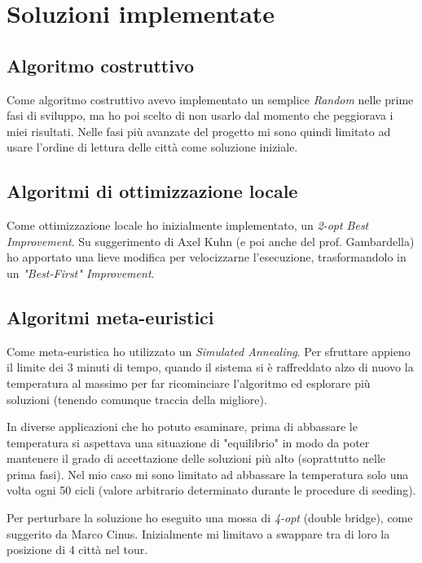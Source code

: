 \chapter*{Soluzioni implementate}
\label{cha_soluzioni}

\section*{Algoritmo costruttivo}
\label{sec_costruttivo}
Come algoritmo costruttivo avevo implementato un semplice \emph{Random} nelle prime fasi di sviluppo, ma ho poi scelto di non usarlo dal momento che peggiorava i miei risultati. Nelle fasi più avanzate del progetto mi sono quindi limitato ad usare l'ordine di lettura delle città come soluzione iniziale.

\section*{Algoritmi di ottimizzazione locale}
\label{sec_ottimizzazione}
Come ottimizzazione locale ho inizialmente implementato, un \emph{2-opt Best Improvement}. Su suggerimento di Axel Kuhn (e poi anche del prof. Gambardella) ho apportato una lieve modifica per velocizzarne l'esecuzione, trasformandolo in un \emph{"Best-First" Improvement}.

\section*{Algoritmi meta-euristici}
\label{sec_metaeuristici}
Come meta-euristica ho utilizzato un \emph{Simulated Annealing}. Per sfruttare appieno il limite dei 3 minuti di tempo, quando il sistema si è raffreddato alzo di nuovo la temperatura al massimo per far ricominciare l'algoritmo ed esplorare più soluzioni (tenendo comunque traccia della migliore). 

In diverse applicazioni che ho potuto esaminare, prima di abbassare le temperatura si aspettava una situazione di "equilibrio" in modo da poter mantenere il grado di accettazione delle soluzioni più alto (soprattutto nelle prima fasi). Nel mio caso mi sono limitato ad abbassare la temperatura solo una volta ogni 50 cicli (valore arbitrario determinato durante le procedure di seeding).

Per perturbare la soluzione ho eseguito una mossa di \emph{4-opt} (double bridge), come suggerito da Marco Cinus. Inizialmente mi limitavo a swappare tra di loro la posizione di 4 città nel tour.
